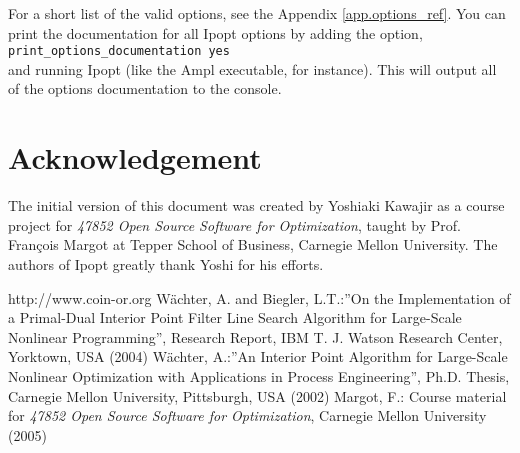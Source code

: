 \documentclass[letter,10pt]{article}
\begin{document}
{For a short list of the valid options, see the Appendix
\ref{app.options_ref}. You can print the documentation for all Ipopt
options by adding the option, \\ {\tt print\_options\_documentation
yes} \\ and running Ipopt (like the Ampl executable, for
instance). This will output all of the options documentation to the
console.

\section*{Acknowledgement}
The initial version of this document was created by Yoshiaki Kawajir
as a course project for \textit{47852 Open Source Software for
Optimization}, taught by Prof. Fran\c cois Margot at Tepper School of
Business, Carnegie Mellon University. The authors of Ipopt greatly
thank Yoshi for his efforts.

\begin{thebibliography}{99}
http://www.coin-or.org
W\"achter, A. and Biegler, L.T.:''On the Implementation of a Primal-Dual
        Interior Point Filter Line Search Algorithm for Large-Scale
        Nonlinear Programming'', Research Report, IBM T. J. Watson
        Research Center, Yorktown, USA (2004)
W\"achter, A.:''An Interior Point Algorithm for Large-Scale Nonlinear
        Optimization with Applications in Process Engineering'',
        Ph.D. Thesis, Carnegie Mellon University, Pittsburgh, USA (2002)
Margot, F.: Course material for \textit{47852 Open Source Software for
        Optimization}, Carnegie Mellon University (2005)
\end{thebibliography}


\appendix
}
\end{document}
